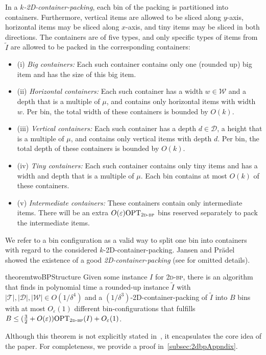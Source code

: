 \documentclass[a4paper,UKenglish,cleveref, autoref, thm-restate]{lipics-v2021}
\newcommand{\eps}{\varepsilon}
\newcommand{\opt}{\mathrm{OPT}}
\newcommand{\twobp}{\textsc{2d-bp}\xspace}
\newcommand{\inter}{intermediate\xspace}
\newcommand{\bigy}{big\xspace}
\newcommand{\tin}{tiny\xspace}
\begin{document}
In a \emph{$k$-2D-container-packing}, each bin of the packing is partitioned into containers. 
Furthermore, vertical items are allowed to be sliced along $y$-axis, horizontal items may be sliced along $x$-axis, and \tin items may be sliced in both directions.
The containers are of five types, and only specific types of items from $\tilde{I}$ are allowed to be packed in the corresponding containers:
\begin{itemize}
\item (i) {\em Big containers:} Each such container contains only one (rounded up) \bigy item and has the size of this \bigy item. 
\item (ii) {\em Horizontal containers:} Each such container has a width $w \in \mathcal{W}$ and a depth that is a multiple of $\mu$, and contains only horizontal items with width $w$.  
Per bin, the total width of these containers is bounded by $O(k)$.
\item (iii) {\em Vertical containers:} 
Each such container has a depth $d \in \mathcal{D}$, a height that is a multiple of $\mu$, and contains only vertical items with depth $d$.
Per bin, the total depth of these containers is bounded by $O(k)$.
\item (iv) {\em Tiny containers:} Each such container contains only \tin items and has a width and depth that is a multiple of $\mu$. Each bin contains at most $O(k)$ of these containers.
\item (v) {\em Intermediate containers:} These containers contain only \inter items. There will be an extra $O(\eps)\opt_{\twobp}$ bins reserved separately to pack the \inter items.
\end{itemize}
We refer to a bin configuration as a valid way to split one bin into containers with regard to the considered $k$-2D-container-packing.
Jansen and Prädel~\cite{jansen2016new} showed the existence of a good {\em 2D-container-packing} (see  for omitted details). 

\begin{restatable}{theorem}{twoBPStructure}
\label{thm:finding-2D-container-packing}
    Given some instance $I$ for \twobp, there is an algorithm that finds in polynomial time a rounded-up instance $\tilde{I}$ with $|\mathcal{T}|, |\mathcal{D}|, |\mathcal{W}| \in O(1/\delta^4)$ and a $(1/\delta^3)$-2D-container-packing of $\tilde{I}$ into $B$ bins with at most $O_{\eps}(1)$ different bin-configurations that fulfills $B \leq (\frac{3}{2}+O(\eps))\opt_{\twobp}(I) +O_{\eps}(1)$.
\end{restatable}
Although this theorem is not explicitly stated in~\cite{jansen2016new}, it encapsulates the core idea of the paper. For completeness, we provide a proof in~\cref{subsec:2dbpAppndix}.
\end{document}
